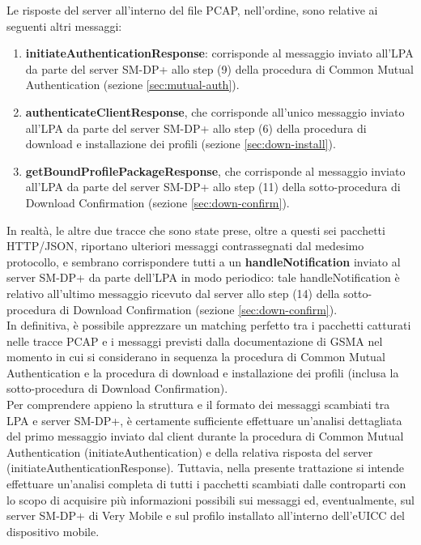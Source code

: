 \documentclass[10pt, oneside]{book}
\begin{document}
Le risposte del server all'interno del file PCAP, nell'ordine, sono relative ai seguenti altri messaggi:
\begin{enumerate}
\item \textbf{initiateAuthenticationResponse}: corrisponde al messaggio inviato all'LPA da parte del server SM-DP+ allo step (9) della procedura di Common Mutual Authentication (sezione \ref{sec:mutual-auth}).
\item \textbf{authenticateClientResponse}, che corrisponde all'unico messaggio inviato all'LPA da parte del server SM-DP+ allo step (6) della procedura di download e installazione dei profili (sezione \ref{sec:down-install}).
\item \textbf{getBoundProfilePackageResponse}, che corrisponde al messaggio inviato all'LPA da parte del server SM-DP+ allo step (11) della sotto-procedura di Download Confirmation (sezione \ref{sec:down-confirm}).
\end{enumerate}
In realtà, le altre due tracce che sono state prese, oltre a questi sei pacchetti HTTP/JSON, riportano ulteriori messaggi contrassegnati dal medesimo protocollo, e sembrano corrispondere tutti a un \textbf{handleNotification} inviato al server SM-DP+ da parte dell'LPA in modo periodico: tale handleNotification è relativo all'ultimo messaggio ricevuto dal server allo step (14) della sotto-procedura di Download Confirmation (sezione \ref{sec:down-confirm}).\\
In definitiva, è possibile apprezzare un matching perfetto tra i pacchetti catturati nelle tracce PCAP e i messaggi previsti dalla documentazione di GSMA \cite{GSMA-docs-new} nel momento in cui si considerano in sequenza la procedura di Common Mutual Authentication e la procedura di download e installazione dei profili (inclusa la sotto-procedura di Download Confirmation).\\
Per comprendere appieno la struttura e il formato dei messaggi scambiati tra LPA e server SM-DP+, è certamente sufficiente effettuare un'analisi dettagliata del primo messaggio inviato dal client durante la procedura di Common Mutual Authentication (initiateAuthentication) e della relativa risposta del server (initiateAuthenticationResponse). Tuttavia, nella presente trattazione si intende effettuare un'analisi completa di tutti i pacchetti scambiati dalle controparti con lo scopo di acquisire più informazioni possibili sui messaggi ed, eventualmente, sul server SM-DP+ di Very Mobile e sul profilo installato all'interno dell'eUICC del dispositivo mobile.
\end{document}
